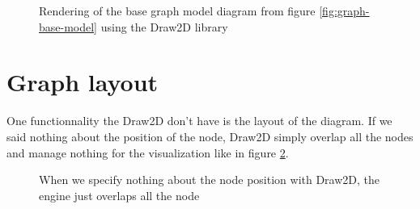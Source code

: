 \begin{figure}[h]
  \centering
  \caption[Render of the base graph model using the Draw2D library]{Rendering of
    the base graph model diagram from figure \ref{fig:graph-base-model} using
    the Draw2D library}
  \label{fig:base-graph-model-html-draw2d}
\end{figure}



\section{Graph layout}
\label{sec:graph-layout}

One functionnality the Draw2D don't have is the layout of the diagram. If we
said nothing about the position of the node, Draw2D simply overlap all the nodes
and manage nothing for the visualization like in figure
\ref{fig:draw2d_overlapping}.

\begin{figure}
  \centering
  \caption[Overlapping of nodes by Draw2D]{When we specify nothing about the
    node position with Draw2D, the engine just overlaps all the node}
  \label{fig:draw2d_overlapping}
\end{figure}

